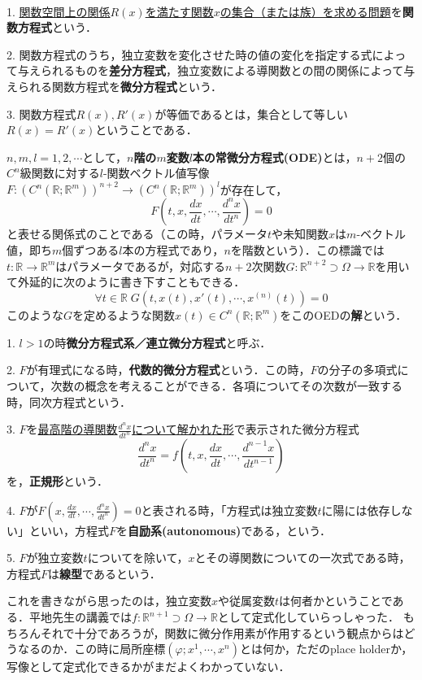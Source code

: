 \documentclass[uplatex,dvipdfmx]{jsreport}
\begin{document}
\begin{definition}[関数方程式としての差分方程式と微分方程式]　

    1. \underline{関数空間上の関係$R(x)$を満たす関数$x$の集合（または族）を求める問題}を\textbf{関数方程式}という．

    2. 関数方程式のうち，独立変数を変化させた時の値の変化を指定する式によって与えられるものを\textbf{差分方程式}，独立変数による導関数との間の関係によって与えられる関数方程式を\textbf{微分方程式}という．
    
    3. 関数方程式$R(x),R'(x)$が等価であるとは，集合として等しい$R(x)=R'(x)$ということである．
\end{definition}
\begin{shadebox}\begin{definition}
    $n,m,l=1,2,\cdots$として，\textbf{$n$階の$m$変数$l$本の常微分方程式(ODE)}とは，$n+2$個の$C^n$級関数に対する$l$-関数ベクトル値写像$F:(C^n(\mathbb{R};\mathbb{R}^m))^{n+2}\to (C^n(\mathbb{R};\mathbb{R}^m))^l$が存在して，
    \[ F\left(t,x,\frac{dx}{dt},\cdots,\frac{d^nx}{dt^n}\right)=0 \]
    と表せる関係式のことである（この時，パラメータ$t$や未知関数$x$は$m$-ベクトル値，即ち$m$個ずつある$l$本の方程式であり，$n$を階数という）．この標識では$t:\mathbb{R}\to\mathbb{R}^m$はパラメータであるが，対応する$n+2$次関数$G:\mathbb{R}^{n+2}\supset\Omega\to\mathbb{R}$を用いて外延的に次のように書き下すこともできる．
    \[ \forall t\in\mathbb{R}\; G(t,x(t),x'(t),\cdots,x^{(n)}(t))=0 \]
    このような$G$を定めるような関数$x(t)\in C^n(\mathbb{R};\mathbb{R}^m)$をこのOEDの\textbf{解}という．
\end{definition}\end{shadebox}
\begin{definition}
    1. $l>1$の時\textbf{微分方程式系／連立微分方程式}と呼ぶ．

    2. $F$が有理式になる時，\textbf{代数的微分方程式}という．この時，$F$の分子の多項式について，次数の概念を考えることができる．各項についてその次数が一致する時，同次方程式という．

    3. $F$を\underline{最高階の導関数}$\frac{d^nx}{dt^n}$\underline{について解かれた形}で表示された微分方程式
    \[ \frac{d^nx}{dt^n} = f\left( t,x,\frac{dx}{dt},\cdots,\frac{d^{n-1}x}{dt^{n-1}} \right) \]
    を，\textbf{正規形}という．
    
    4. $F$が$F\left(x,\frac{dx}{dt},\cdots,\frac{d^nx}{dt^n}\right)=0$と表される時，「方程式は独立変数$t$に陽には依存しない」といい，方程式$F$を\textbf{自励系(autonomous)}である，という．

    5. $F$が独立変数$t$についてを除いて，$x$とその導関数についての一次式である時，方程式$F$は\textbf{線型}であるという．
\end{definition}
\begin{remark}[関数としての変数]
    これを書きながら思ったのは，独立変数$x$や従属変数$t$は何者かということである．平地先生の講義では$f:\mathbb{R}^{n+1}\supset\Omega\to\mathbb{R}$として定式化していらっしゃった．
    もちろんそれで十分であろうが，関数に微分作用素が作用するという観点からはどうなるのか．この時に局所座標$(\varphi;x^1,\cdots,x^n)$とは何か，ただのplace holderか，写像として定式化できるかがまだよくわかっていない．
\end{remark}
\end{document}

